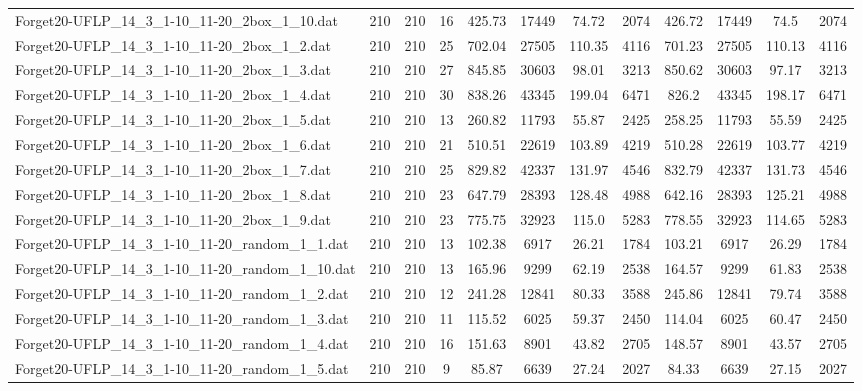 \begin{sidewaystable}[!ht]
{\begin{tabular}{lccccccccccc}
Forget20-UFLP\_14\_3\_1-10\_11-20\_2box\_1\_10.dat & 210 & 210 & 16 & 425.73 & 17449 & 74.72 & 2074 & 426.72 & 17449 & 74.5 & 2074 \\
Forget20-UFLP\_14\_3\_1-10\_11-20\_2box\_1\_2.dat & 210 & 210 & 25 & 702.04 & 27505 & 110.35 & 4116 & 701.23 & 27505 & 110.13 & 4116 \\
Forget20-UFLP\_14\_3\_1-10\_11-20\_2box\_1\_3.dat & 210 & 210 & 27 & 845.85 & 30603 & 98.01 & 3213 & 850.62 & 30603 & 97.17 & 3213 \\
Forget20-UFLP\_14\_3\_1-10\_11-20\_2box\_1\_4.dat & 210 & 210 & 30 & 838.26 & 43345 & 199.04 & 6471 & 826.2 & 43345 &  \textcolor{blue2}{198.17} & 6471 \\
Forget20-UFLP\_14\_3\_1-10\_11-20\_2box\_1\_5.dat & 210 & 210 & 13 & 260.82 & 11793 & 55.87 & 2425 & 258.25 & 11793 & 55.59 & 2425 \\
Forget20-UFLP\_14\_3\_1-10\_11-20\_2box\_1\_6.dat & 210 & 210 & 21 & 510.51 & 22619 & 103.89 & 4219 & 510.28 & 22619 &  \textcolor{blue2}{103.77} & 4219 \\
Forget20-UFLP\_14\_3\_1-10\_11-20\_2box\_1\_7.dat & 210 & 210 & 25 & 829.82 & 42337 & 131.97 & 4546 & 832.79 & 42337 &  \textcolor{blue2}{131.73} & 4546 \\
Forget20-UFLP\_14\_3\_1-10\_11-20\_2box\_1\_8.dat & 210 & 210 & 23 & 647.79 & 28393 & 128.48 & 4988 & 642.16 & 28393 &  \textcolor{blue2}{125.21} & 4988 \\
Forget20-UFLP\_14\_3\_1-10\_11-20\_2box\_1\_9.dat & 210 & 210 & 23 & 775.75 & 32923 & 115.0 & 5283 & 778.55 & 32923 &  \textcolor{blue2}{114.65} & 5283 \\
Forget20-UFLP\_14\_3\_1-10\_11-20\_random\_1\_1.dat & 210 & 210 & 13 & 102.38 & 6917 &  \textcolor{blue2}{26.21} & 1784 & 103.21 & 6917 & 26.29 & 1784 \\
Forget20-UFLP\_14\_3\_1-10\_11-20\_random\_1\_10.dat & 210 & 210 & 13 & 165.96 & 9299 & 62.19 & 2538 & 164.57 & 9299 & 61.83 & 2538 \\
Forget20-UFLP\_14\_3\_1-10\_11-20\_random\_1\_2.dat & 210 & 210 & 12 & 241.28 & 12841 & 80.33 & 3588 & 245.86 & 12841 &  \textcolor{blue2}{79.74} & 3588 \\
Forget20-UFLP\_14\_3\_1-10\_11-20\_random\_1\_3.dat & 210 & 210 & 11 & 115.52 & 6025 & 59.37 & 2450 & 114.04 & 6025 & 60.47 & 2450 \\
Forget20-UFLP\_14\_3\_1-10\_11-20\_random\_1\_4.dat & 210 & 210 & 16 & 151.63 & 8901 & 43.82 & 2705 & 148.57 & 8901 & 43.57 & 2705 \\
Forget20-UFLP\_14\_3\_1-10\_11-20\_random\_1\_5.dat & 210 & 210 & 9 & 85.87 & 6639 & 27.24 & 2027 & 84.33 & 6639 & 27.15 & 2027 \\

\end{tabular}}
\end{sidewaystable}
